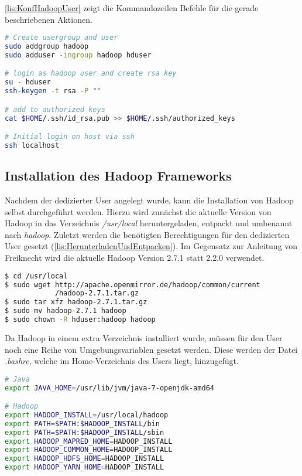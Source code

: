 \autoref{lis:KonfHadoopUser} zeigt die Kommandozeilen Befehle für die gerade beschriebenen Aktionen. \\

\begin{lstlisting}[language=bash, caption={Konfiguration des Hadoop Users}, label=lis:KonfHadoopUser]
# Create usergroup and user
sudo addgroup hadoop
sudo adduser -ingroup hadoop hduser

# login as hadoop user and create rsa key
su - hduser
ssh-keygen -t rsa -P ""

# add to authorized keys
cat $HOME/.ssh/id_rsa.pub >> $HOME/.ssh/authorized_keys

# Initial login on host via ssh
ssh localhost
\end{lstlisting}

\subsection{Installation des Hadoop Frameworks}
Nachdem der dedizierter User angelegt wurde, kann die Installation von Hadoop selbst durchgeführt werden. Hierzu wird zunächst die aktuelle Version von Hadoop in das Verzeichnis \textit{/usr/local} heruntergeladen, entpackt und umbenannt nach \textit{hadoop}. Zuletzt werden die benötigten Berechtigungen für den dedizierten User gesetzt (\autoref{lis:HerunterladenUndEntpacken}). Im Gegensatz zur Anleitung von Freiknecht wird die aktuelle Hadoop Version 2.7.1 statt 2.2.0 verwendet. \\

\begin{lstlisting}[language=bash, caption={Herunterladen und entpacke von Hadoop}, label=lis:HerunterladenUndEntpacken]
$ cd /usr/local
$ sudo wget http://apache.openmirror.de/hadoop/common/current
            /hadoop-2.7.1.tar.gz
$ sudo tar xfz hadoop-2.7.1.tar.gz
$ sudo mv hadoop-2.7.1 hadoop
$ sudo chown -R hduser:hadoop hadoop
\end{lstlisting}

Da Hadoop in einem extra Verzeichnis installiert wurde, müssen für den User noch eine Reihe von Umgebungsvariablen gesetzt werden. Diese werden der Datei \textit{.bashrc}, welche im Home-Verzeichnis des Users liegt, hinzugefügt. \\

\newpage
\begin{lstlisting}[language=bash, caption={Umgebungsvariablen für Hadoop}, label=lis:Umgebungsvariablen]
# Java
export JAVA_HOME=/usr/lib/jvm/java-7-openjdk-amd64

# Hadoop
export HADOOP_INSTALL=/usr/local/hadoop
export PATH=$PATH:$HADOOP_INSTALL/bin
export PATH=$PATH:$HADOOP_INSTALL/sbin
export HADOOP_MAPRED_HOME=HADOOP_INSTALL
export HADOOP_COMMON_HOME=HADOOP_INSTALL
export HADOOP_HDFS_HOME=HADOOP_INSTALL
export HADOOP_YARN_HOME=HADOOP_INSTALL
\end{lstlisting}

